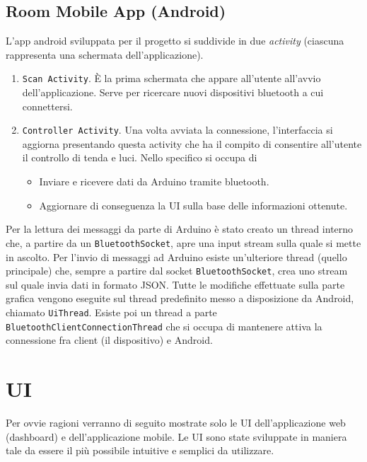 \documentclass[a4paper,12pt]{report}
\begin{document}
\subsection{Room Mobile App (Android)}
L'app android sviluppata per il progetto si suddivide in due \emph{activity} (ciascuna rappresenta una schermata dell'applicazione).
\begin{enumerate}
    \item \texttt{Scan Activity}. È la prima schermata che appare all'utente all'avvio dell'applicazione. Serve per ricercare nuovi dispositivi bluetooth a cui connettersi.
    \item \texttt{Controller Activity}. Una volta avviata la connessione, l'interfaccia si aggiorna presentando questa activity che ha il compito di consentire all'utente il controllo di tenda e luci. Nello specifico si occupa di
    \begin{itemize}
        \item Inviare e ricevere dati da Arduino tramite bluetooth.
        \item Aggiornare di conseguenza la UI sulla base delle informazioni ottenute.
    \end{itemize}
\end{enumerate}
Per la lettura dei messaggi da parte di Arduino è stato creato un thread interno che, a partire da un \texttt{BluetoothSocket}, apre una input stream sulla quale si mette in ascolto. 
Per l'invio di messaggi ad Arduino esiste un'ulteriore thread (quello principale) che, sempre a partire dal socket \texttt{BluetoothSocket}, crea uno stream sul quale invia dati in formato JSON.
Tutte le modifiche effettuate sulla parte grafica vengono eseguite sul thread predefinito messo a disposizione da Android, chiamato \texttt{UiThread}.
Esiste poi un thread a parte \texttt{BluetoothClientConnectionThread} che si occupa di mantenere attiva la connessione fra client (il dispositivo) e Android.


\section{UI}
Per ovvie ragioni verranno di seguito mostrate solo le UI dell'applicazione web (dashboard) e dell'applicazione mobile.
Le UI sono state sviluppate in maniera tale da essere il più possibile intuitive e semplici da utilizzare.
\end{document}
